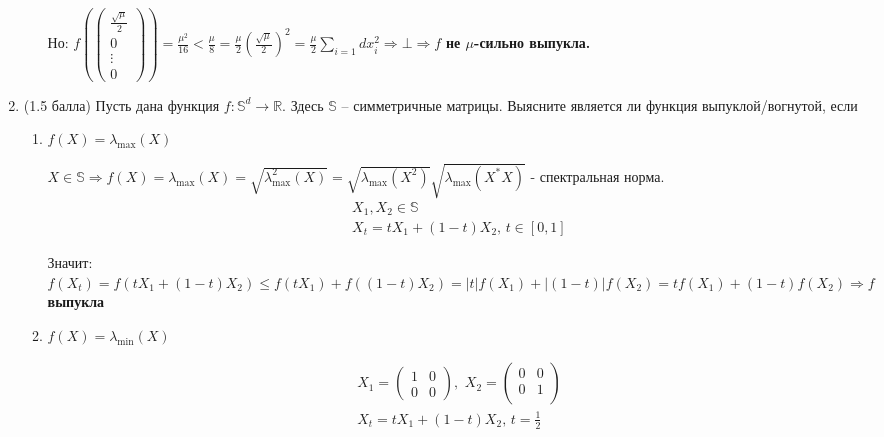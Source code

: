 \documentclass[a5paper,twoside,russian]{article}
\begin{document}
\begin{enumerate}[label=\textbf{Задача \arabic*.}]
\begin{prf}
\begin{enumerate}
            Но:
            $f\left(\begin{pmatrix}
                \frac{\sqrt{\mu}}{2} \\
                0 \\
                \vdots \\
                0
            \end{pmatrix}\right) = \frac{\mu^2}{16} < \frac{\mu}{8} = \frac{\mu}{2} \left( \frac{\sqrt{\mu}}{2} \right)^2 = \frac{\mu}{2} \sum\limits_{i=1}{d} x_i^2 \Rightarrow \bot \Rightarrow f$ \textbf{не $\mu$-сильно выпукла.}


        \end{enumerate}
    \end{prf}

    \item (1.5 балла) Пусть дана функция $f: \mathbb{S}^d \to \mathbb{R}$. Здесь $\mathbb{S}$ -- симметричные матрицы. Выясните является ли функция выпуклой/вогнутой, если
    \begin{enumerate}
        \item $f(X) = \lambda_{\max}(X)$
        
        \vspace{5pt}
        \begin{prf}
             $X \in \mathbb{S} \Rightarrow f(X) = \lambda_{\max}(X) = \sqrt{\lambda_{\max}^2(X)} = \sqrt{\lambda_{\max}(X^2)} \sqrt{\lambda_{\max}(X^* X)}$ - спектральная норма. 
            \[
            \begin{aligned}
                & X_1, X_2 \in \mathbb{S} \\
                & X_t = tX_1 + (1-t)X_2, \, t \in [0, 1]
            \end{aligned}
            \]
            
            Значит: $f(X_t) = f(tX_1 + (1-t)X_2) \leq f(tX_1) + f((1-t)X_2) = |t|f(X_1) + |(1-t)| f(X_2) = t f(X_1) + (1-t) f(X_2) \Rightarrow f$ \textbf{выпукла}
        \end{prf}

        \item $f(X) = \lambda_{\min}(X)$
        
        \begin{prf}
            \[
            \begin{aligned}
            & X_1 = 
            \begin{pmatrix}
                1 & 0 \\
                0 & 0
            \end{pmatrix},
            \, \, X_2 = 
            \begin{pmatrix}
                0 & 0 \\
                0 & 1 \\
            \end{pmatrix} \\
            & X_t = tX_1 + (1-t)X_2, \, t = \frac{1}{2}
            \end{aligned}
            \]
            

\end{prf}
\end{enumerate}
\end{enumerate}
\end{document}
